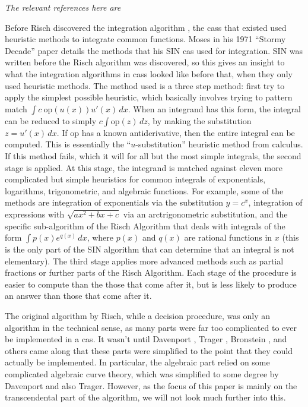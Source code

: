 \emph{The relevant references here
are~\cite{moses1971symbolic,risch1969problem}}

Before Risch discovered the \gls{integration} algorithm
\cite{risch1969problem}, the \glspl{cas} that existed used heuristic
methods to integrate common functions. Moses in his 1971 ``Stormy
Decade'' paper \cite{moses1971symbolic} details the methods that his SIN
\gls{cas} used for integration. SIN was written before the Risch
algorithm was discovered, so this gives an insight to what the
integration algorithms in \glspl{cas} looked like before that, when they
only used heuristic methods.  The method used is a three step method:
first try to apply the simplest possible heuristic, which basically
involves trying to pattern match $\int{c\ \mathrm{op}(u(x))u'(x)\,dx}$.
When an \gls{integrand} has this form, the integral can be reduced to
simply $c\int{\mathrm{op}(z)\,dz}$, by making the substitution
$z=u'(x)\,dx$.  If $\mathrm{op}$ has a known antiderivative, then the
entire integral can be computed.  This is essentially the
``$u$-substitution'' heuristic method from calculus.  If this method
fails, which it will for all but the most simple integrals, the second
stage is applied.  At this stage, the \gls{integrand} is matched against
eleven more complicated but simple heuristics for common integrals of
exponentials, logarithms, trigonometric, and \gls{algebraic} functions.  For
example, some of the methods are \gls{integration} of exponentials via the
substitution $y=c^x$, integration of expressions with $\sqrt{ax^2 + bx +
c}$ via an arc\-trig\-o\-no\-met\-ric substitution, and the specific
sub-algorithm of the Risch Algorithm that deals with integrals of the
form $\int{p(x)e^{q(x)}\,dx}$, where $p(x)$ and $q(x)$ are
\glspl{rational function} in $x$ (this is the only part of the SIN
algorithm that can determine that an integral is not \gls{elementary}).
The third stage applies more advanced methods such as partial fractions
or further parts of the Risch Algorithm.  Each stage of the procedure is
easier to compute than the those that come after it, but is less likely
to produce an answer than those that come after it.

The original algorithm by Risch, while a decision procedure, was only an
algorithm in the technical sense, as many parts were far too complicated
to ever be implemented in a \gls{cas}.  It wasn't until Davenport
\cite{davenport1984integration}, Trager \cite{trager1984integration},
Bronstein \cite{bronstein2005symbolic}, and others came along that
these parts were simplified to the point that they could actually be
implemented.  In particular, the \gls{algebraic} part relied on some
complicated algebraic curve theory, which was simplified to some degree
by Davenport and also Trager.  However, as the focus of this paper is
mainly on the \gls{transcendental} part of the algorithm, we will not
look much further into this.  